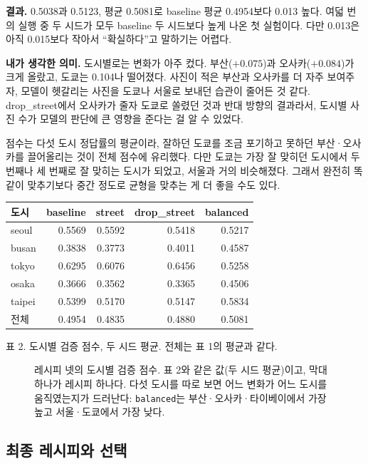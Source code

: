\documentclass[11pt]{article}
\begin{document}
\textbf{결과.} 0.5038과 0.5123, 평균 0.5081로 baseline 평균 0.4954보다 0.013
높다. 여덟 번의 실행 중 두 시드가 모두 baseline 두 시드보다 높게 나온 첫 실험이다.
다만 0.013은 아직 0.015보다 작아서 ``확실하다''고 말하기는 어렵다.

\textbf{내가 생각한 의미.} 도시별로는 변화가 아주 컸다. 부산($+0.075$)과
오사카($+0.084$)가 크게 올랐고, 도쿄는 0.104나 떨어졌다. 사진이 적은 부산과
오사카를 더 자주 보여주자, 모델이 헷갈리는 사진을 도쿄나 서울로 보내던 습관이
줄어든 것 같다. drop\_street에서 오사카가 줄자 도쿄로 쏠렸던 것과 반대 방향의
결과라서, 도시별 사진 수가 모델의 판단에 큰 영향을 준다는 걸 알 수 있었다.

점수는 다섯 도시 정답률의 평균이라, 잘하던 도쿄를 조금 포기하고 못하던
부산·오사카를 끌어올리는 것이 전체 점수에 유리했다. 다만 도쿄는 가장 잘 맞히던
도시에서 두 번째나 세 번째로 잘 맞히는 도시가 되었고, 서울과 거의 비슷해졌다.
그래서 완전히 똑같이 맞추기보다 중간 정도로 균형을 맞추는 게 더 좋을 수도 있다.

\begin{center}\footnotesize
\begin{tabular}{lrrrr}
\toprule
도시 & baseline & street & drop\_street & balanced \\
\midrule
seoul & 0.5569 & 0.5592 & 0.5418 & 0.5217 \\
busan & 0.3838 & 0.3773 & 0.4011 & 0.4587 \\
tokyo & 0.6295 & 0.6076 & 0.6456 & 0.5258 \\
osaka & 0.3666 & 0.3562 & 0.3365 & 0.4506 \\
taipei & 0.5399 & 0.5170 & 0.5147 & 0.5834 \\
\midrule
전체 & 0.4954 & 0.4835 & 0.4880 & 0.5081 \\
\bottomrule
\end{tabular}

{\footnotesize 표 2. 도시별 검증 점수, 두 시드 평균. 전체는 표 1의 평균과 같다.}
\end{center}

\begin{figure}[h]
\centering
{}
\caption{레시피 넷의 도시별 검증 점수. 표 2와 같은 값(두 시드 평균)이고, 막대 하나가 레시피
하나다. 다섯 도시를 따로 보면 어느 변화가 어느 도시를 움직였는지가 드러난다:
\texttt{balanced}는 부산·오사카·타이베이에서 가장 높고 서울·도쿄에서 가장 낮다.}
\end{figure}

\subsection*{최종 레시피와 선택}
\end{document}
